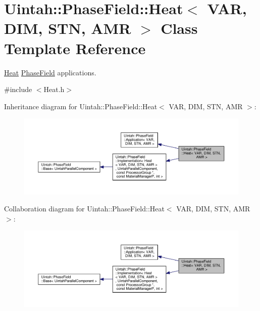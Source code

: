 \hypertarget{classUintah_1_1PhaseField_1_1Heat}{}\section{Uintah\+:\+:Phase\+Field\+:\+:Heat$<$ V\+AR, D\+IM, S\+TN, A\+MR $>$ Class Template Reference}
\label{classUintah_1_1PhaseField_1_1Heat}


\hyperlink{classUintah_1_1PhaseField_1_1Heat}{Heat} \hyperlink{namespaceUintah_1_1PhaseField}{Phase\+Field} applications.  




{\ttfamily \#include $<$Heat.\+h$>$}



Inheritance diagram for Uintah\+:\+:Phase\+Field\+:\+:Heat$<$ V\+AR, D\+IM, S\+TN, A\+MR $>$\+:\nopagebreak
\begin{figure}[H]
\begin{center}
\leavevmode
\includegraphics[width=350pt]{classUintah_1_1PhaseField_1_1Heat__inherit__graph}
\end{center}
\end{figure}


Collaboration diagram for Uintah\+:\+:Phase\+Field\+:\+:Heat$<$ V\+AR, D\+IM, S\+TN, A\+MR $>$\+:\nopagebreak
\begin{figure}[H]
\begin{center}
\leavevmode
\includegraphics[width=350pt]{classUintah_1_1PhaseField_1_1Heat__coll__graph}
\end{center}
\end{figure}
